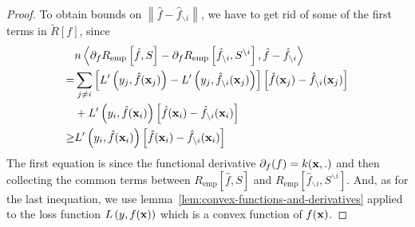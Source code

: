 \begin{proof}
	To obtain bounds on $\left\|\hat{f}-\hat{f}_{\backslash i}\right\|$, we have to get rid of some of the first terms in $\tilde{R}[f]$, since
	\begin{equation}
		\begin{aligned}
			     & n\left\langle\partial_{f}R_{\text{emp}}\left[\hat{f},S\right]-\partial_{f}R_{\text{emp}}\left[\hat{f}_{\backslash i},S^{\backslash i}\right],\hat{f}-\hat{f}_{\backslash i}\right\rangle               \\
			=    & \sum_{j\neq i}\left[L^{\prime}\left(y_{j},\hat{f}({\bf x}_{j})\right)-L^{\prime}\left(y_{j},\hat{f}_{\backslash i}({\bf x}_{j})\right)\right]\left[\hat{f}({\bf x}_{j})-\hat{f}_{\backslash i}({\bf x}_{j})\right] \\
			     & +L^{\prime}\left(y_{i},\hat{f}({\bf x}_{i})\right)\left[\hat{f}({\bf x}_{i})-\hat{f}_{\backslash i}({\bf x}_{i})\right]                                                                                         \\
			\geq & L^{\prime}\left(y_{i},\hat{f}({\bf x}_{i})\right)\left[\hat{f}({\bf x}_{i})-\hat{f}_{\backslash i}({\bf x}_{i})\right]
		\end{aligned}
	\end{equation}
	The first equation is since the functional derivative $\partial_{f}(f)=k({\bf x},.)$ and then collecting the common terms between $R_{\text{emp}}\left[\hat{f}, S\right]$ and $R_{\text{emp}}\left[\hat{f}_{\backslash i}, S^{\backslash i}\right]$. And, as for the last inequation, we use lemma~\ref{lem:convex-functions-and-derivatives} applied to the loss function $L\left(y,f({\bf x})\right)$ which is a convex function of $f({\bf x})$.


\end{proof}
